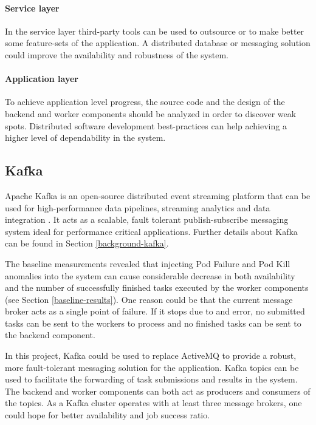 \paragraph{Service layer} In the service layer third-party tools can be used to outsource or to make better some feature-sets of the application. A distributed database or messaging solution could improve the availability and robustness of the system.

\paragraph{Application layer} To achieve application level progress, the source code and the design of the backend and worker components should be analyzed in order to discover weak spots. Distributed software development best-practices can help achieving a higher level of dependability in the system.

\subsection{Kafka}

Apache Kafka is an open-source distributed event streaming platform that can be used for high-performance data pipelines, streaming analytics and data integration \cite{Kafka}. It acts as a scalable, fault tolerant publish-subscribe messaging system ideal for performance critical applications. Further details about Kafka can be found in Section \ref{background-kafka}.

The baseline measurements revealed that injecting Pod Failure and Pod Kill anomalies into the system can cause considerable decrease in both availability and the number of successfully finished tasks executed by the worker components (see Section \ref{baseline-results}). One reason could be that the current message broker acts as a single point of failure. If it stops due to and error, no submitted tasks can be sent to the workers to process and no finished tasks can be sent to the backend component.

In this project, Kafka could be used to replace ActiveMQ to provide a robust, more fault-tolerant messaging solution for the application. Kafka topics can be used to facilitate the forwarding of task submissions and results in the system. The backend and worker components can both act as producers and consumers of the topics. As a Kafka cluster operates with at least three message brokers, one could hope for better availability and job success ratio.

